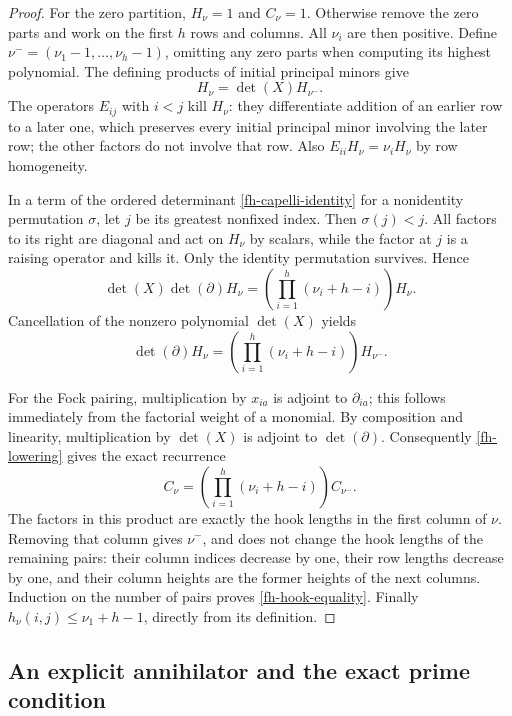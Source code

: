 \begin{proof}
For the zero partition, $H_\nu=1$ and $C_\nu=1$.
Otherwise remove the zero parts and work on the first $h$ rows
and columns. All $\nu_i$ are then positive. Define
$\nu^-=(\nu_1-1,\ldots,\nu_h-1)$, omitting any zero parts
when computing its highest polynomial. The defining products of
initial principal minors give
\[
                             H_\nu=\det(X)H_{\nu^-}.
\]
The operators $E_{ij}$ with $i<j$ kill $H_\nu$: they
differentiate addition of an earlier row to a later one, which
preserves every initial principal minor involving the later row;
the other factors do not involve that row. Also
$E_{ii}H_\nu=\nu_iH_\nu$ by row homogeneity.

In a term of the ordered determinant
\eqref{fh-capelli-identity} for a nonidentity permutation
$\sigma$, let $j$ be its greatest nonfixed index. Then
$\sigma(j)<j$. All factors to its right are diagonal and
act on $H_\nu$ by scalars, while the factor at $j$ is a
raising operator and kills it. Only the identity permutation
survives. Hence
\[
 \det(X)\det(\partial)H_\nu
                  =\left(\prod_{i=1}^h(\nu_i+h-i)\right)H_\nu.
\]
Cancellation of the nonzero polynomial $\det(X)$ yields
\begin{equation}\label{fh-lowering}
 \det(\partial)H_\nu
                  =\left(\prod_{i=1}^h(\nu_i+h-i)\right)H_{\nu^-}.
\end{equation}

For the Fock pairing, multiplication by $x_{ia}$ is adjoint to
$\partial_{ia}$; this follows immediately from the factorial
weight of a monomial. By composition and linearity,
multiplication by $\det(X)$ is adjoint to $\det(\partial)$.
Consequently \eqref{fh-lowering} gives the exact recurrence
\begin{equation}\label{fh-column-recurrence}
                 C_\nu=
                    \left(\prod_{i=1}^h(\nu_i+h-i)\right)C_{\nu^-}.
\end{equation}
The factors in this product are exactly the hook lengths in
the first column of $\nu$. Removing that column gives
$\nu^-$, and does not change the hook lengths of the remaining
pairs: their column indices decrease by one, their row lengths
decrease by one, and their column heights are the former heights
of the next columns. Induction on the number of pairs proves
\eqref{fh-hook-equality}. Finally
$h_\nu(i,j)\le\nu_1+h-1$, directly from its definition.
\end{proof}

\subsection{An explicit annihilator and the exact prime condition}

